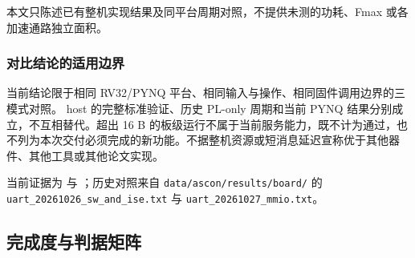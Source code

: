 本文只陈述已有整机实现结果及同平台周期对照，不提供未测的功耗、Fmax 或各加速通路独立面积。

\Needspace{85pt}

\subsubsection{对比结论的适用边界}

当前结论限于相同 RV32/PYNQ 平台、相同输入与操作、相同固件调用边界的三模式对照。 host 的完整标准验证、历史 PL-only 周期和当前 PYNQ 结果分别成立，不互相替代。超出 16 B 的板级运行不属于当前服务能力，既不计为通过，也不列为本次交付必须完成的新功能。不据整机资源或短消息延迟宣称优于其他器件、其他工具或其他论文实现。

当前证据为 \pufresult 与 \pufreports；历史对照来自 \texttt{data/ascon/results/board/} 的 \texttt{uart\_20261026\_sw\_and\_ise.txt} 与 \texttt{uart\_20261027\_mmio.txt}。

\Needspace{150pt}

\subsection{完成度与判据矩阵}

